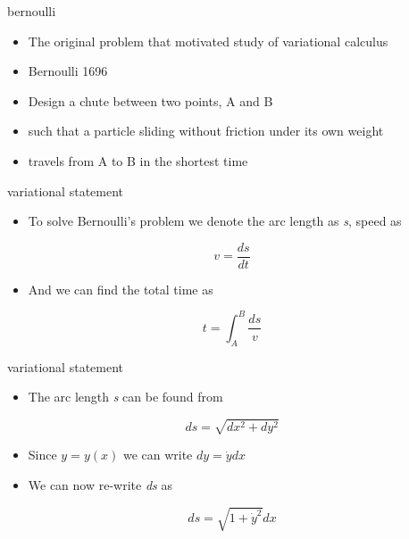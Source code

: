 \documentclass[
  letterpaper,
  ignorenonframetext,
  aspectratio=43,
  handout,
  12pt]{beamer}
\providecommand{\tightlist}{%
  \setlength{\itemsep}{0pt}\setlength{\parskip}{0pt}}
\providecommand{\tightlist}{%
\setlength{\itemsep}{0pt}\setlength{\parskip}{0pt}}
\begin{document}
\begin{frame}{bernoulli}
\protect\hypertarget{bernoulli}{}
\begin{itemize}
\tightlist
\item
  The original problem that motivated study of variational calculus
\item
  Bernoulli 1696
\item
  Design a chute between two points, A and B
\item
  such that a particle sliding without friction under its own weight
\item
  travels from A to B in the shortest time
\end{itemize}
\end{frame}

\begin{frame}{variational statement}
\protect\hypertarget{variational-statement}{}
\begin{itemize}
\tightlist
\item
  To solve Bernoulli's problem we denote the arc length as \emph{s},
  speed as
\end{itemize}

\[v = \frac{ds}{dt}\]

\begin{itemize}
\tightlist
\item
  And we can find the total time as
\end{itemize}

\[t = \int_A^B \frac{ds}{v}\]
\end{frame}

\begin{frame}{variational statement}
\protect\hypertarget{variational-statement-1}{}
\begin{itemize}
\tightlist
\item
  The arc length \emph{s} can be found from
\end{itemize}

\[ds = \sqrt{dx^2 + dy^2}\]

\begin{itemize}
\tightlist
\item
  Since \(y=y(x)\) we can write \(dy = \dot{y} dx\)
\item
  We can now re-write \emph{ds} as
\end{itemize}

\[ds = \sqrt{1 + \dot{y}^2}dx\]
\end{frame}
\end{document}
